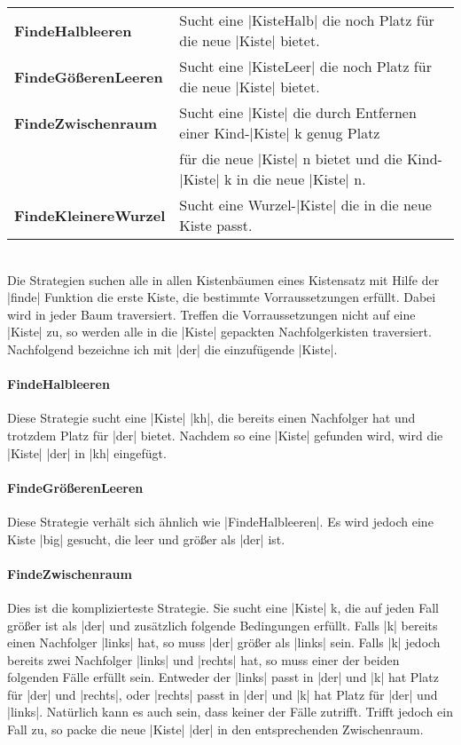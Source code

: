 \begin{tabular}{ll}
 \textbf{FindeHalbleeren}    & Sucht eine |KisteHalb| die noch Platz für die neue |Kiste| bietet. \\
 \textbf{FindeGößerenLeeren} & Sucht eine |KisteLeer| die noch Platz für die neue |Kiste| bietet. \\
 \textbf{FindeZwischenraum}  & Sucht eine |Kiste| die durch Entfernen einer Kind-|Kiste| k genug Platz \\
                             & \hfill für die neue |Kiste| n bietet und die Kind-|Kiste| k in die neue |Kiste| n. \\
 \textbf{FindeKleinereWurzel}& Sucht eine Wurzel-|Kiste| die in die neue Kiste passt.      \\
\end{tabular} \\

 Die Strategien suchen alle in allen Kistenbäumen eines Kistensatz mit Hilfe der |finde| Funktion die erste Kiste,
  die bestimmte Vorraussetzungen erfüllt.
 Dabei wird in jeder Baum traversiert. Treffen die Vorraussetzungen nicht auf eine |Kiste| zu,
  so werden alle in die |Kiste| gepackten Nachfolgerkisten traversiert.
 Nachfolgend bezeichne ich mit |der| die einzufügende |Kiste|.
\paragraph{FindeHalbleeren}
 Diese Strategie sucht eine |Kiste| |kh|, die bereits einen Nachfolger hat und trotzdem Platz für |der| bietet.
 Nachdem so eine |Kiste| gefunden wird, wird die |Kiste| |der| in |kh| eingefügt.
\paragraph{FindeGrößerenLeeren}
 Diese Strategie verhält sich ähnlich wie |FindeHalbleeren|. Es wird jedoch eine Kiste |big| gesucht, die leer und größer als |der| ist.
\paragraph{FindeZwischenraum}
 Dies ist die komplizierteste Strategie. Sie sucht eine |Kiste| k, die auf jeden Fall größer ist als |der| und zusätzlich folgende Bedingungen erfüllt.
 Falls |k| bereits einen Nachfolger |links| hat, so muss |der| größer als |links| sein.
 Falls |k| jedoch bereits zwei Nachfolger |links| und |rechts| hat, so muss einer der beiden folgenden Fälle erfüllt sein.
  Entweder der |links|  passt in |der| und |k| hat Platz für |der| und |rechts|,
          oder |rechts| passt in |der| und |k| hat Platz für |der| und |links|.
 Natürlich kann es auch sein, dass keiner der Fälle zutrifft. Trifft jedoch ein Fall zu, so packe die neue |Kiste| |der| in den entsprechenden Zwischenraum.
